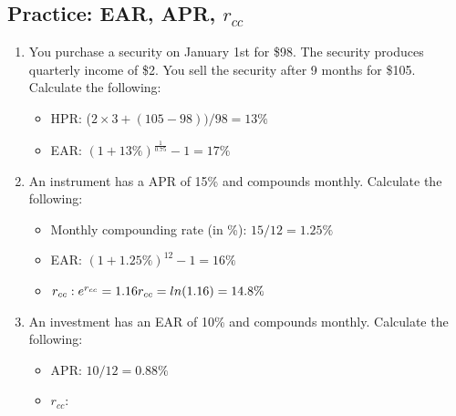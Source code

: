 \documentclass[11pt]{article}
\theoremstyle{definition}
\begin{document}
    \begin{shaded}
    \subsection{Practice: EAR, APR, $r_{cc}$}
    \begin{enumerate}
        \item You purchase a security on January 1st for \$98.  The security produces quarterly income of \$2.  You sell the security after 9 months for \$105.   Calculate the following:
    \begin{itemize}
        \item HPR: ($2\times3 + (105-98)) / 98 = 13\%$
        \item EAR: $(1+13\%)^{\frac{1}{0.75}} - 1 = 17\%$
    \end{itemize}
    \item An instrument has a APR of 15\% and compounds monthly.  Calculate the following:
        \begin{itemize}
        \item Monthly compounding rate (in \%): $15/12 = 1.25\%$
        \item EAR: $(1+1.25\%)^{12} -1 = 16\%$
        \item $r_{cc}: e^{r_{cc}} = 1.16 \\ r_{cc} = ln(1.16) = 14.8\%$
    \end{itemize}
    \item An investment has an EAR of 10\% and compounds monthly. Calculate the following:
    \begin{itemize}
        \item APR: $10/12 = 0.88\%$
        \item $r_{cc}:$ 
    \end{itemize}
    \end{enumerate}
    \end{shaded}
\end{document}
